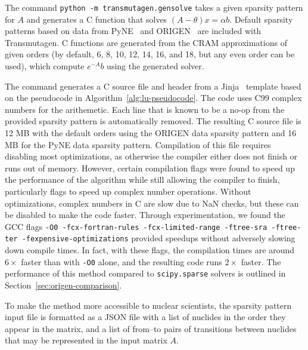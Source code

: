 The command \texttt{python -m transmutagen.gensolve} takes a given sparsity
pattern for $A$ and generates a C function that solves $(A - \theta)x =\alpha
b$. Default sparsity patterns based on data from PyNE~\cite{ationneeded} and
ORIGEN~\cite{ationneeded} are included with Transmutagen. C functions are
generated from the CRAM approximations of given orders (by default, 6, 8, 10,
12, 14, 16, and 18, but any even order can be used), which compute $e^{-A}b$
using the generated solver.

The command generates a C source file and header from a
Jinja~\cite{ationneeded} template based on the pseudocode in
Algorithm~\ref{alg:lu-pseudocode}. The code uses C99 complex numbers for the
arithemetic. Each line that is known to be a no-op from the provided sparsity
pattern is automatically removed. The resulting C source file is 12 MB with
the default orders using the ORIGEN data sparsity pattern and 16 MB for the
PyNE data sparsity pattern. Compilation of this file requires disabling most
optimizations, as otherwise the compiler either does not finish or runs out of
memory. However, certain compilation flags were found to speed up the
performance of the algorithm while still allowing the compiler to finish,
particularly flags to speed up complex number operations. Without
optimizations, complex numbers in C are slow due to NaN checks, but these can
be disabled to make the code faster. Through experimentation, we found the GCC flags \texttt{-O0
-fcx-fortran-rules -fcx-limited-range -ftree-sra -ftree-ter
-fexpensive-optimizations} provided speedups without adversely slowing down
compile times. In fact, with these flags, the compilation times are around
$6\times$ faster than with \texttt{-O0} alone, and the resulting code runs
$2\times$ faster. The performance of this method compared to
\texttt{scipy.\allowbreak{}sparse} solvers is outlined in
Section~\ref{sec:origen-comparison}.

To make the method more accessible to nuclear scientists, the sparsity pattern
input file is formatted as a JSON file with a list of nuclides in the order
they appear in the matrix, and a list of from--to pairs of transitions between
nuclides that may be represented in the input matrix $A$.
